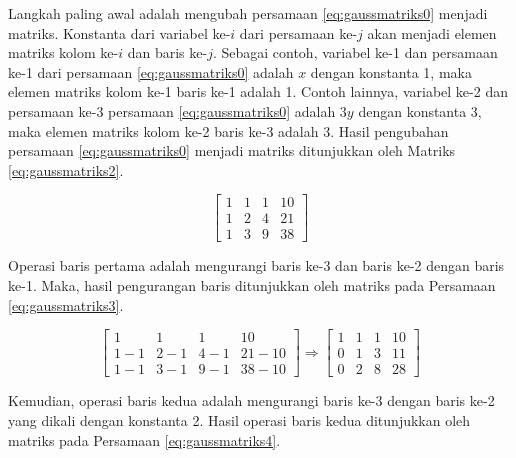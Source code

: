 Langkah paling awal adalah mengubah persamaan \ref{eq:gaussmatriks0} menjadi matriks. Konstanta dari variabel ke-$i$ dari persamaan ke-$j$ akan menjadi elemen matriks kolom ke-$i$ dan baris ke-$j$. Sebagai contoh, variabel ke-1 dan persamaan ke-1 dari persamaan \ref{eq:gaussmatriks0} adalah $x$ dengan konstanta 1, maka elemen matriks kolom ke-1 baris ke-1 adalah 1. Contoh lainnya, variabel ke-2 dan persamaan ke-3 persamaan \ref{eq:gaussmatriks0} adalah $3y$ dengan konstanta 3, maka elemen matriks kolom ke-2 baris ke-3 adalah 3. Hasil pengubahan persamaan \ref{eq:gaussmatriks0} menjadi matriks ditunjukkan oleh Matriks \ref{eq:gaussmatriks2}.

\begin{center}
	\setlength\arraycolsep{10pt}
	\begin{equation}
		\begin{bmatrix}
				1 	& 1 	& 1 	& 10 		\\[1em]
				1 	& 2 	& 4 	& 21 		\\[1em]
				1 	& 3 	& 9 	& 38
		\end{bmatrix} \label{eq:gaussmatriks2}
	\end{equation}
\end{center}

Operasi baris pertama adalah mengurangi baris ke-3 dan baris ke-2 dengan baris ke-1. Maka, hasil pengurangan baris ditunjukkan oleh matriks pada Persamaan \ref{eq:gaussmatriks3}.

\begin{center}
	\setlength\arraycolsep{10pt}
	\begin{equation}
		\begin{bmatrix}
				1 			& 1 		& 1 		& 10 				\\[1em]
				1 - 1 	& 2 - 1	& 4 - 1	& 21 - 10		\\[1em]
				1 - 1		& 3 - 1	& 9 - 1	& 38 - 10
		\end{bmatrix} \Rightarrow
		\begin{bmatrix}
				1 	& 1 	& 1 	& 10 		\\[1em]
				0 	& 1 	& 3 	& 11 		\\[1em]
				0 	& 2 	& 8 	& 28
		\end{bmatrix} \label{eq:gaussmatriks3}
	\end{equation}
\end{center}

Kemudian, operasi baris kedua adalah mengurangi baris ke-3 dengan baris ke-2 yang dikali dengan konstanta 2. Hasil operasi baris kedua ditunjukkan oleh matriks pada Persamaan \ref{eq:gaussmatriks4}.


